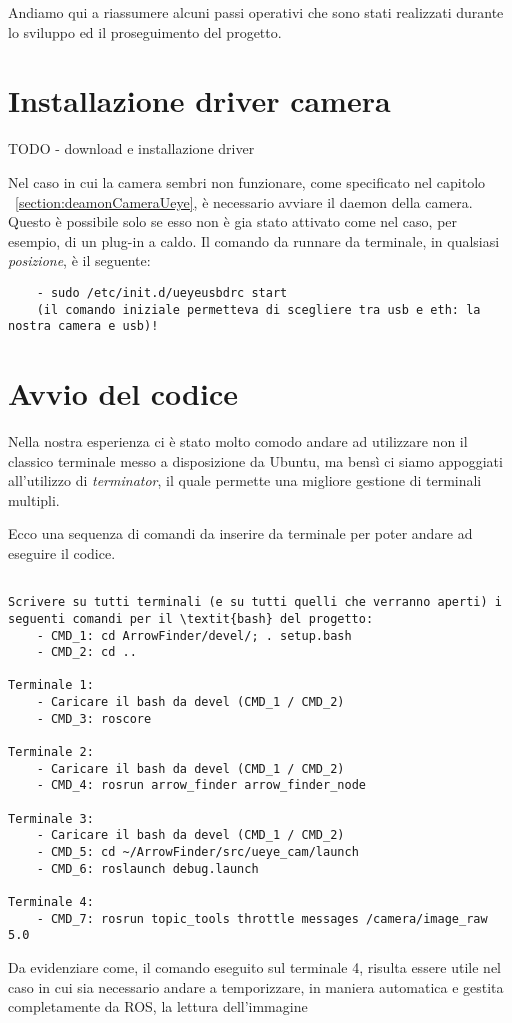 Andiamo qui a riassumere alcuni passi operativi che sono stati realizzati durante lo sviluppo ed il proseguimento del progetto.

\section{Installazione driver camera}
TODO - download e installazione driver

Nel caso in cui la camera sembri non funzionare, come specificato nel capitolo ~\ref{section:deamonCameraUeye}, è necessario avviare il daemon della camera.
Questo è possibile solo se esso non è gia stato attivato come nel caso, per esempio, di un plug-in a caldo.
Il comando da runnare da terminale, in qualsiasi \textit{posizione}, è il seguente:
\begin{lstlisting}
	- sudo /etc/init.d/ueyeusbdrc start 
	(il comando iniziale permetteva di scegliere tra usb e eth: la nostra camera e usb)!
\end{lstlisting}

\section{Avvio del codice}
Nella nostra esperienza ci è stato molto comodo andare ad utilizzare non il classico terminale messo a disposizione da Ubuntu, ma bensì ci siamo appoggiati all'utilizzo di \textit{terminator}, il quale permette una migliore gestione di terminali multipli.

Ecco una sequenza di comandi da inserire da terminale per poter andare ad eseguire il codice. 
\begin{lstlisting}

Scrivere su tutti terminali (e su tutti quelli che verranno aperti) i seguenti comandi per il \textit{bash} del progetto:
	- CMD_1: cd ArrowFinder/devel/; . setup.bash
	- CMD_2: cd ..

Terminale 1:
	- Caricare il bash da devel (CMD_1 / CMD_2)
	- CMD_3: roscore

Terminale 2:
	- Caricare il bash da devel (CMD_1 / CMD_2)
	- CMD_4: rosrun arrow_finder arrow_finder_node
	
Terminale 3:
	- Caricare il bash da devel (CMD_1 / CMD_2)
	- CMD_5: cd ~/ArrowFinder/src/ueye_cam/launch
	- CMD_6: roslaunch debug.launch 

Terminale 4:
	- CMD_7: rosrun topic_tools throttle messages /camera/image_raw 5.0 
\end{lstlisting}
Da evidenziare come, il comando eseguito sul terminale 4, risulta essere utile nel caso in cui sia necessario andare a temporizzare, in maniera automatica e gestita completamente da ROS, la lettura dell'immagine